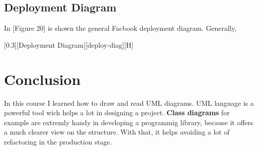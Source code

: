 \documentclass{article}
\begin{document}
		\subsection{Deployment Diagram}
			In [Figure 20] is shown the general Facbook deployment diagram. Generally, 

			[0.3][Deployment Diagram][deploy-diag][H]			

	\section{Conclusion}
		In this course I learned how to draw and read UML diagrams. UML language is a powerful tool wich helps a lot in designing a project. \textbf{Class diagrams} for example are extremly handy in developing a programmig library, because it offers a much clearer view on the structure. With that, it helps avoiding a lot of refactoring in the production stage. 
\end{document}
